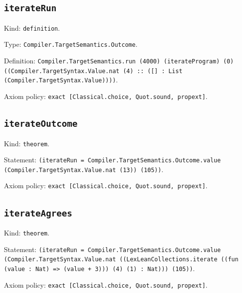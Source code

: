 \documentclass[11pt]{article}
\begin{document}
\subsection*{\texttt{iterateRun}}
\noindent Kind: \texttt{definition}.\par
\noindent Type: \texttt{Compiler.TargetSemantics.Outcome}.\par
\noindent Definition: \texttt{Compiler.TargetSemantics.run (4000) (iterateProgram) (0) ((Compiler.TargetSyntax.Value.nat (4) :: ([] : List (Compiler.TargetSyntax.Value))))}.\par
\noindent Axiom policy: \texttt{exact [Classical.choice, Quot.sound, propext]}.\par
\subsection*{\texttt{iterateOutcome}}
\noindent Kind: \texttt{theorem}.\par
\noindent Statement: \texttt{(iterateRun = Compiler.TargetSemantics.Outcome.value (Compiler.TargetSyntax.Value.nat (13)) (105))}.\par
\noindent Axiom policy: \texttt{exact [Classical.choice, Quot.sound, propext]}.\par
\subsection*{\texttt{iterateAgrees}}
\noindent Kind: \texttt{theorem}.\par
\noindent Statement: \texttt{(iterateRun = Compiler.TargetSemantics.Outcome.value (Compiler.TargetSyntax.Value.nat ((LexLeanCollections.iterate ((fun (value : Nat) => (value + 3))) (4) (1) : Nat))) (105))}.\par
\noindent Axiom policy: \texttt{exact [Classical.choice, Quot.sound, propext]}.\par
\end{document}
